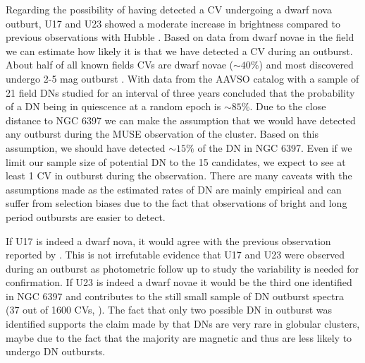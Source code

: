 Regarding the possibility of having detected a CV undergoing a dwarf nova outburt, U17 and U23 showed a moderate increase in brightness compared to previous observations with Hubble \citep{cohn_identification_2010}. Based on data from dwarf novae in the field we can estimate how likely it is that we have detected a CV during an outburst. About half of all known fields CVs are dwarf novae ($\sim 40 \%$) and most discovered undergo 2-5 mag outburst \citep{2001PASP..113..764D,warner_cataclysmic_2003}. With data from the AAVSO catalog with a sample of 21 field DNs studied for an interval of three years \cite{Szkody_21DN_1984} concluded that the probability of a DN being in quiescence at a random epoch is $\sim 85 \%$. Due to the close distance to NGC 6397 we can make the assumption that we would have detected any outburst during the MUSE observation of the cluster. Based on this assumption, we should have detected $\sim 15 \%$ of the DN in NGC 6397. Even if we limit our sample size of potential DN to the 15 candidates, we expect to see at least 1 CV in outburst during the observation. There are many caveats with the assumptions made as the estimated rates of DN are mainly empirical and can suffer from selection biases due to the fact that observations of bright and long period outbursts are easier to detect. 

If U17 is indeed a dwarf nova, it would agree with the previous observation reported by \cite{shara_erupting_2005}. This is not irrefutable evidence that U17 and U23 were observed during an outburst as photometric follow up to study the variability is needed for confirmation. If U23 is indeed a dwarf novae it would be the third one identified in NGC 6397 \citep{shara_erupting_2005} and contributes to the still small sample of DN outburst spectra (37 out of 1600 CVs, \citealt{2001PASP..113..764D}). The fact that only two possible DN in outburst was identified supports the claim made by \cite{shara_CVsDN_1996} that DNs are very rare in globular clusters, maybe due to the fact that the majority are magnetic and thus are less likely to undergo DN outbursts. \\ 


